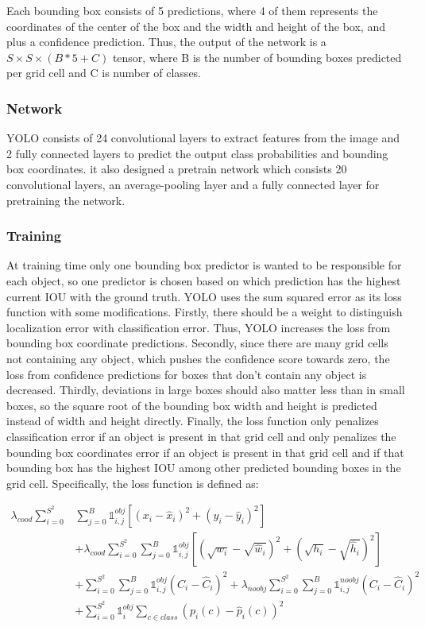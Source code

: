 Each bounding box consists of 5 predictions, where 4 of them represents the coordinates of the center of the box and the width and height of the box, and plus a confidence prediction. Thus, the output of the network is a $S \times S \times (B * 5 + C)$ tensor, where B is the number of bounding boxes predicted per grid cell and C is number of classes.

\subsubsection{Network}
YOLO consists of 24 convolutional layers to extract features from the image and 2 fully connected layers to predict the output class probabilities and bounding box coordinates. it also designed a pretrain network which consists 20 convolutional layers, an average-pooling layer and a fully connected layer for pretraining the network.

\subsubsection{Training}

At training time only one bounding box predictor is wanted to be responsible for each object, so one predictor is chosen based on which prediction has the highest current IOU with the ground truth. YOLO uses the sum squared error as its loss function with some modifications. Firstly, there should be a weight to distinguish localization error with classification error. Thus, YOLO increases the loss from bounding box coordinate predictions. Secondly, since there are many grid cells not containing any object, which pushes the confidence score towards zero, the loss from confidence predictions for boxes that don’t contain any object is decreased. Thirdly, deviations in large boxes should also matter less than in small boxes, so the square root of the bounding box width and height is predicted instead of width and height directly. Finally, the loss function only penalizes classification error if an object is present in that grid cell and only penalizes the bounding box coordinates error if an object is present in that grid cell and if that bounding box has the highest IOU among other predicted bounding boxes in the grid cell. Specifically, the loss function is defined as:

\begin{equation}
\begin{aligned}
 \lambda_{cood}\sum^{S^{2}}_{i=0}&\sum^{B}_{j=0}\mathbb{1}_{i,j}^{obj}\left[(x_{i} - \hat{x}_{i})^{2} + (y_{i} - \hat{y}_{i})^{2}\right]\\
  &+ \lambda_{cood}\sum^{S^{2}}_{i=0}\sum^{B}_{j=0}\mathbb{1}_{i,j}^{obj}\left[(\sqrt{w_{i}} - \sqrt{\hat{w}_{i}})^{2} + (\sqrt{h_{i}} - \sqrt{\hat{h}_{i}})^{2}\right]\\
   &+ \sum^{S^{2}}_{i=0}\sum^{B}_{j=0}\mathbb{1}_{i,j}^{obj}(C_{i} - \hat{C}_{i})^{2} +  \lambda_{noobj}\sum^{S^{2}}_{i=0}\sum^{B}_{j=0}\mathbb{1}_{i,j}^{noobj}(C_{i} - \hat{C}_{i})^{2}\\
    &+ \sum^{S^{2}}_{i=0}\mathbb{1}_{i}^{obj}\sum_{c\in{class}}(p_{i}(c) - \hat{p}_{i}(c))^{2}
\end{aligned}
\end{equation}

